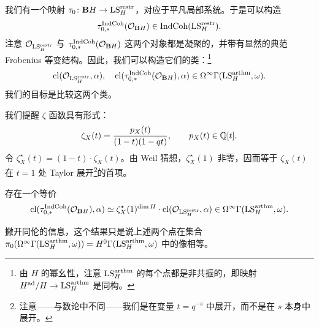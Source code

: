 我们有一个映射 $\tau_0\colon\mathbf{B}H\to\mathrm{LS}^{\mathrm{restr}}_{H}$，对应于平凡局部系统。于是可以构造
\[
  \tau^{\mathrm{IndCoh}}_{0,*}(\mathcal{O}_{\mathbf{B}H})\in\mathrm{IndCoh}(\mathrm{LS}^{\mathrm{restr}}_{H}).
\]
注意 $\mathcal{O}_{\mathrm{LS}^{\mathrm{restr}}_{H}}$ 与 $\tau^{\mathrm{IndCoh}}_{0,*}(\mathcal{O}_{\mathbf{B}H})$ 这两个对象都是凝聚的，并带有显然的典范 Frobenius 等变结构。因此，我们可以构造它们的类：\footnote{由 $H$ 的幂幺性，注意 $\mathrm{LS}^{\mathrm{arthm}}_{H}$ 的每个点都是非共振的，即映射 $H^{\operatorname{ad}}/H\to\mathrm{LS}^{\mathrm{arthm}}_{H}$ 是同构。}
\[
  \operatorname{cl}(\mathcal{O}_{\mathrm{LS}^{\mathrm{restr}}_{H}},\alpha),\quad
  \operatorname{cl}(\tau^{\mathrm{IndCoh}}_{0,*}(\mathcal{O}_{\mathbf{B}H}),\alpha)
  \in\Omega^\infty\Gamma(\mathrm{LS}^{\mathrm{arthm}}_{H},\omega).
\]
我们的目标是比较这两个类。


我们提醒 $\zeta$ 函数具有形式：
\[
  \zeta_X(t)=\frac{p_X(t)}{(1-t)(1-qt)},\qquad p_X(t)\in\mathbb{Q}[t].
\]
令 $\zeta^{\star}_X(t)=(1-t)\cdot\zeta_X(t)$。由 Weil 猜想，$\zeta^{\star}_X(1)$ 非零，因而等于 $\zeta_X(t)$ 在 $t=1$ 处 Taylor 展开\footnote{注意——与数论中不同——我们是在变量 $t=q^{-s}$ 中展开，而不是在 $s$ 本身中展开。}的首项。


\begin{lem}
存在一个等价
\[
  \operatorname{cl}(\tau^{\mathrm{IndCoh}}_{0,*}(\mathcal{O}_{\mathbf{B}H}),\alpha)
  \simeq \zeta^{\star}_X(1)^{\dim H}\cdot\operatorname{cl}(\mathcal{O}_{\mathrm{LS}^{\mathrm{restr}}_{H}},\alpha)
  \in\Omega^\infty\Gamma(\mathrm{LS}^{\mathrm{arthm}}_{H},\omega).
\]
\end{lem}

撇开同伦的信息，这个结果只是说上述两个点在集合
$\pi_0(\Omega^\infty\Gamma(\mathrm{LS}^{\mathrm{arthm}}_{H},\omega))=H^0\Gamma(\mathrm{LS}^{\mathrm{arthm}}_{H},\omega)$ 中的像相等。

